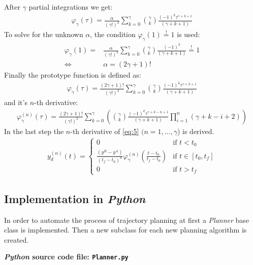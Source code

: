 \documentclass[a4paper,11pt,headings=standardclasses,parskip=half]{scrartcl}
\newcommand{\py}{\emph{Python}\xspace}
\begin{document}
After $\gamma$ partial integrations we get:
\begin{align*}
\varphi_\gamma(\tau)= \frac{\alpha}{(\gamma!)^2} \sum_{k=0}^{\gamma} \binom{\gamma}{k} \frac{(-1)^k\tau^{\gamma+k+1}}{(\gamma+k+1)}
\end{align*}
To solve for the unknown $\alpha$, the  condition $\varphi_\gamma(1)\overset{!}{=}1$ is used:
\begin{align*}
\varphi_\gamma(1)= &\frac{\alpha}{(\gamma!)^2} \sum_{k=0}^{\gamma} \binom{\gamma}{k} \frac{(-1)^k}{(\gamma+k+1)} \overset{!}{=} 1 \\
\Leftrightarrow \quad & \alpha = (2\gamma+1)!
\end{align*}
Finally the prototype function is defined as:
\begin{align}
\varphi_\gamma(\tau)= \frac{(2\gamma+1)!}{(\gamma!)^2} \sum_{k=0}^{\gamma} \binom{\gamma}{k} \frac{(-1)^k\tau^{\gamma+k+1}}{(\gamma+k+1)}
\end{align}
and it's $n$-th derivative:
\begin{align}
\varphi_\gamma^{(n)}(\tau)= \frac{(2\gamma+1)!}{(\gamma!)^2} \sum_{k=0}^{\gamma} \left(\binom{\gamma}{k} \frac{(-1)^k\tau^{\gamma+k-n+1}}{(\gamma+k+1)}\prod_{i=1}^n(\gamma+k-i+2)\right)
\end{align}
In the last step the $n$-th derivative of \eqref{eq:5} $(n=1,...,\gamma$) is derived.
\begin{align}
y_d^{(n)}(t) = \begin{cases} 0 & \textrm{if } t<t_0 \\ 
\frac{(y^B-y^A)}{(t_f-t_0)^n}\varphi_\gamma^{(n)}\left(\frac{t-t_0}{t_f-t_0}\right) &\textrm{if } t \in [t_0, t_f] \\ 
0&\textrm{if } t>t_f\end{cases}
\end{align}
\subsection{Implementation in \py}
In order to automate the process of trajectory planning at first a \emph{Planner} base class is implemented. Then a new subclass for each new planning algorithm is created.

\textbf{\py source code file: \texttt{Planner.py}}
\end{document}
